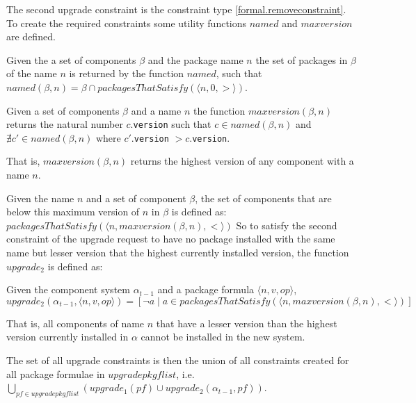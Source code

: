 The second upgrade constraint is the constraint type \ref{formal.removeconstraint}.
To create the required constraints some utility functions $named$ and $maxversion$ are defined.

\begin{defs}
Given the a set of components $\beta$ and the package name $n$ the set of packages in $\beta$ of the name $n$ is returned by the function $named$, such that
$named(\beta,n) = \beta \cap packagesThatSatisfy(\langle n,0,> \rangle)$.
\end{defs} 

\begin{defs}
Given a set of components $\beta$ and a name $n$ the function $maxversion(\beta,n)$ returns the natural number $c$.\verb+version+ 
such that $c \in named(\beta,n)$ and $\nexists c' \in named(\beta,n)$ where $c'$.\verb+version+ $> c$.\verb+version+.
\end{defs}
That is, $maxversion(\beta,n)$ returns the highest version of any component with a name $n$.

Given the name $n$ and a set of component $\beta$, the set of components that are below this maximum version of $n$ in $\beta$ is defined as:
$packagesThatSatisfy(\langle n, maxversion(\beta,n), < \rangle)$
So to satisfy the second constraint of the upgrade request to have no package installed with the same name but lesser version that the highest currently installed version,
the function  $upgrade_2$ is defined as:
\begin{defs}
Given the component system $\alpha_{t-1}$ and a package formula $\langle n,v,op \rangle$,
$upgrade_2(\alpha_{t-1},\langle n,v,op \rangle) = [\neg a \mid a \in packagesThatSatisfy(\langle n, maxversion(\beta,n), < \rangle)]$
\end{defs}
That is, all components of name $n$ that have a lesser version than the highest version currently installed in $\alpha$ cannot be installed in the new system. 

The set of all upgrade constraints is then the union of all constraints created for all package formulae in $upgradepkgflist$,
i.e. $\bigcup \limits_{pf \in upgradepkgflist} (upgrade_1(pf) \cup upgrade_2(\alpha_{t-1},pf))$.

